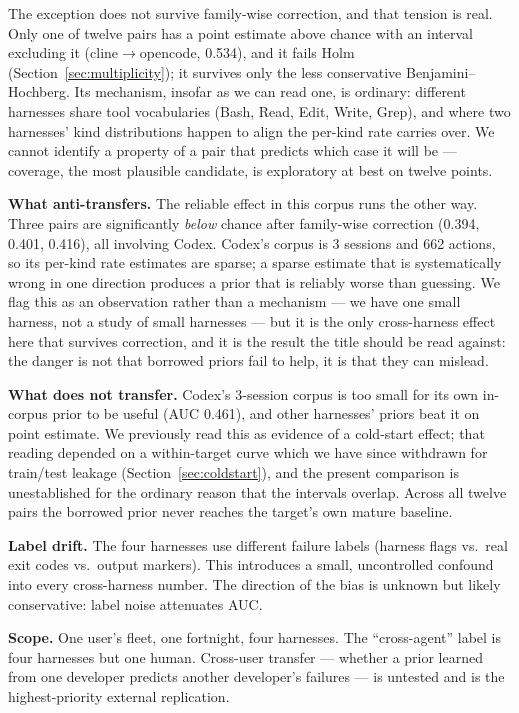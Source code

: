 \documentclass[11pt]{article}
\begin{document}
The exception does not survive family-wise correction, and that tension is
real. Only one of twelve pairs has a
point estimate above chance with an interval excluding it
(cline$\to$opencode, 0.534), and it fails Holm
(Section~\ref{sec:multiplicity}); it survives only the less conservative
Benjamini--Hochberg. Its mechanism, insofar as we can read one, is ordinary:
different harnesses share tool vocabularies (Bash, Read, Edit, Write, Grep),
and where two harnesses' kind distributions happen to align the per-kind
rate carries over. We cannot identify a property of a pair that predicts
which case it will be --- coverage, the most plausible candidate, is
exploratory at best on twelve points.

\textbf{What anti-transfers.} The reliable effect in this corpus runs the
other way. Three pairs are significantly \emph{below} chance after
family-wise correction (0.394, 0.401, 0.416), all involving Codex. Codex's
corpus is 3 sessions and 662 actions, so its per-kind rate estimates are
sparse; a sparse estimate that is systematically wrong in one direction
produces a prior that is reliably worse than guessing. We flag this as an
observation rather than a mechanism --- we have one small harness, not a
study of small harnesses --- but it is the only cross-harness effect here
that survives correction, and it is the result the title should be read
against: the danger is not that borrowed priors fail to help, it is that
they can mislead.

\textbf{What does not transfer.} Codex's 3-session corpus is too small for
its own in-corpus prior to be useful (AUC 0.461), and other harnesses'
priors beat it on point estimate. We previously read this as evidence of a
cold-start effect; that reading depended on a within-target curve which we
have since withdrawn for train/test leakage
(Section~\ref{sec:coldstart}), and the present comparison is unestablished
for the ordinary reason that the intervals overlap. Across all twelve
pairs the borrowed prior never reaches the target's own mature baseline.

\textbf{Label drift.} The four harnesses use different failure labels
(harness flags vs.\ real exit codes vs.\ output markers). This introduces
a small, uncontrolled confound into every cross-harness number. The
direction of the bias is unknown but likely conservative: label noise
attenuates AUC.

\textbf{Scope.} One user's fleet, one fortnight, four harnesses. The
``cross-agent'' label is four harnesses but one human. Cross-user
transfer --- whether a prior learned from one developer predicts another
developer's failures --- is untested and is the highest-priority external
replication.
\end{document}

